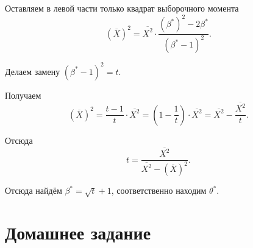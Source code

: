 \begin{enumerate}[label=\alph*)]
  Оставляем в левой части только квадрат выборочного момента
  $$ \left( \overline{X} \right)^2 =
    \overline{X^2} \cdot
    \frac{ \left( \beta^* \right)^2 - 2 \beta^*}{ \left( \beta^* - 1 \right)^2}.$$

  Делаем замену $ \left( \beta^* - 1 \right)^2 = t$.

  Получаем
  $$ \left( \overline{X} \right)^2 =
    \frac{t - 1}{t} \cdot \overline{X^2} =
    \left( 1 - \frac{1}{t} \right) \cdot \overline{X^2} =
    \overline{X^2} - \frac{ \overline{X^2}}{t}.$$

  Отсюда
  $$t =
    \frac{ \overline{X^2}}{ \overline{X^2} - \left( \overline{X} \right)^2}.$$

  Отсюда найдём $ \beta^* = \sqrt{t} + 1$, соответственно находим $ \theta^*$.
\end{enumerate}

\section*{Домашнее задание}
